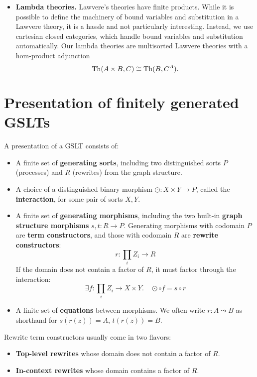 \documentclass{article}
\begin{document}
\begin{itemize}
    \item {\bf Lambda theories.}  Lawvere's theories have finite products. While it is possible to define the machinery of bound variables and substitution in a Lawvere theory, it is a hassle and not particularly interesting. Instead, we use cartesian closed categories, which handle bound variables and substitution automatically.  Our lambda theories are multisorted Lawvere theories with a hom-product adjunction
$${\rm Th}(A \times B, C) \cong {\rm Th}(B, C^A).$$

\end{itemize}

\section{Presentation of finitely generated GSLTs}

A presentation of a GSLT consists of:

\begin{itemize}
    \item A finite set of \textbf{generating sorts}, including two distinguished sorts $P$ (processes) and $R$ (rewrites) from the graph structure.
    \item A choice of a distinguished binary morphism $\odot : X \times Y \to P$, called the \textbf{interaction}, for some pair of sorts $X, Y$.
    \item A finite set of \textbf{generating morphisms}, including the two built-in \textbf{graph structure morphisms} $s, t : R \to P$. Generating morphisms with codomain $P$ are \textbf{term constructors}, and those with codomain $R$ are \textbf{rewrite constructors}:
    \[
    r : \prod_i Z_i \to R
    \]
    If the domain does not contain a factor of $R$, it must factor through the interaction:
    \[
    \exists f : \prod_i Z_i \to X \times Y. \quad \odot \circ f = s \circ r
    \]
    \item A finite set of \textbf{equations} between morphisms. We often write $r : A \leadsto B$ as shorthand for $s(r(z)) = A$, $t(r(z)) = B$.
\end{itemize}

Rewrite term constructors usually come in two flavors:

\begin{itemize}
    \item \textbf{Top-level rewrites} whose domain does not contain a factor of $R$.
    \item \textbf{In-context rewrites} whose domain contains a factor of $R$.
\end{itemize}
\end{document}
